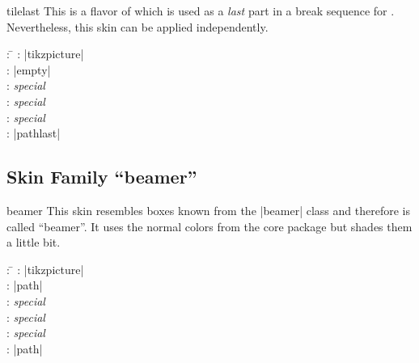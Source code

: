 \begin{dispExample}
\end{dispExample}


\clearpage
\begin{docSkin}[doc new=2016-02-25]{tilelast}
This is a flavor of  which is used as a \emph{last} part
in a break sequence for .
Nevertheless, this skin can be applied independently.
\begin{tcolorbox}[skintable=tilelast]
  \begin{tabbing}
    : \=\kill
    :  \> |tikzpicture|\\ 
    :           \> |empty|\\
    : \> \emph{special}\\ 
    :        \> \emph{special}\\
    :    \> \emph{special}\\
    :           \> |pathlast|
  \end{tabbing}
\end{tcolorbox}
\end{docSkin}


\begin{dispExample}
\end{dispExample}



\clearpage
\subsection{Skin Family \enquote{beamer}}

\begin{docSkin}{beamer}
  This skin resembles boxes known from the |beamer| class and therefore is
  called \enquote{beamer}. It uses the normal colors from the core package but shades
  them a little bit.
\begin{tcolorbox}[skintable=beamer]
  \begin{tabbing}
    : \=\kill
    :  \> |tikzpicture|\\ 
    :           \> |path|\\
    : \> \emph{special}\\ 
    :        \> \emph{special}\\
    :    \> \emph{special}\\
    :           \> |path|
  \end{tabbing}
\end{tcolorbox}
\end{docSkin}



